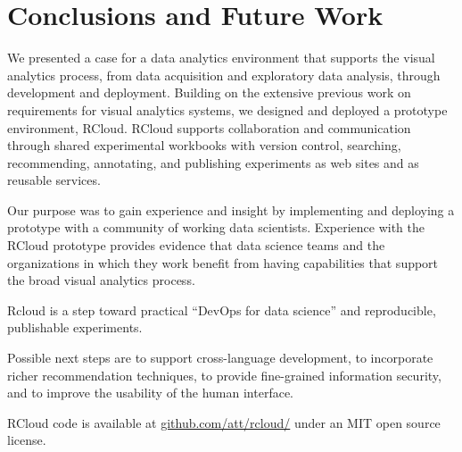 \section{Conclusions and Future Work}

We presented a case for a data analytics environment that
supports the visual analytics process, from data acquisition
and exploratory data analysis, through development and deployment.
Building on the extensive previous work on requirements for
visual analytics systems, we designed and deployed a prototype
environment, RCloud.  RCloud supports collaboration and communication
through shared experimental workbooks with version
control, searching, recommending, annotating, and publishing
experiments as web sites and as reusable services. 

Our purpose was to gain experience and insight by implementing and
deploying a prototype with a community of working data scientists.
Experience with the RCloud prototype provides evidence that data
science teams and the organizations in which they work benefit from
having capabilities that support the broad visual analytics process.

Rcloud is a step toward practical ``DevOps for data science'' and
reproducible, publishable experiments.

Possible next steps are to support cross-language development,
to incorporate richer recommendation techniques, to provide fine-grained
information security, and to improve the usability of the human interface.

RCloud code is available 
at \url{github.com/att/rcloud/}
under an MIT open source license.
